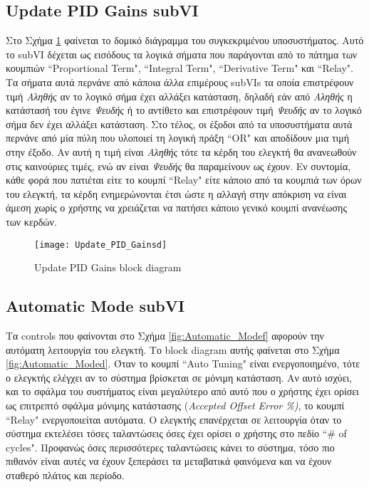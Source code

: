 \subsection{Update PID Gains subVI}

Στο Σχήμα \ref{fig:Update_PID_Gainsd} φαίνεται το δομικό διάγραμμα του συγκεκριμένου υποσυστήματος. Αυτό το subVI δέχεται ως εισόδους τα λογικά σήματα που παράγονται από το πάτημα των κουμπιών ``Proportional Term", ``Integral Term", ``Derivative Term" και ``Relay". Τα σήματα αυτά περνάνε από κάποια άλλα επιμέρους subVIs τα οποία επιστρέφουν τιμή \textit{Αληθής} αν το λογικό σήμα έχει αλλάξει κατάσταση, δηλαδή εάν από \textit{Αληθής} η κατάστασή του έγινε \textit{Ψευδής} ή το αντίθετο και επιστρέφουν τιμή \textit{Ψευδής} αν το λογικό σήμα δεν έχει αλλάξει κατάσταση. Στο τέλος, οι έξοδοι από τα υποσυστήματα αυτά περνάνε από μία πύλη που υλοποιεί τη λογική πράξη ``OR" και αποδίδουν μια τιμή στην έξοδο. Αν αυτή η τιμή είναι \emph{Αληθής} τότε τα κέρδη του ελεγκτή θα ανανεωθούν στις καινούριες τιμές, ενώ αν είναι \emph{Ψευδής} θα παραμείνουν ως έχουν. Εν συντομία, κάθε φορά που πατιέται είτε το κουμπί ``Relay" είτε κάποιο από τα κουμπιά των όρων του ελεγκτή, τα κέρδη ενημερώνονται έτσι ώστε η αλλαγή στην απόκριση να είναι άμεση χωρίς ο χρήστης να χρειάζεται να πατήσει κάποιο γενικό κουμπί ανανέωσης των κερδών.

\begin{figure}[h!]
  \centering
  \texttt{[image: Update\_PID\_Gainsd]}
  \caption{Update PID Gains block diagram}
  \label{fig:Update_PID_Gainsd}
\end{figure}

\subsection{Automatic Mode subVI}

Τα controls που φαίνονται στο Σχήμα \ref{fig:Automatic_Modef} αφορούν την αυτόματη λειτουργία του ελεγκτή. Το block diagram αυτής φαίνεται στο Σχήμα \ref{fig:Automatic_Moded}. Όταν το κουμπί ``Auto Tuning" είναι ενεργοποιημένο, τότε ο ελεγκτής ελέγχει αν το σύστημα βρίσκεται σε μόνιμη κατάσταση. Αν αυτό ισχύει, και το σφάλμα του συστήματος είναι μεγαλύτερο από αυτό που ο χρήστης έχει ορίσει ως επιτρεπτό σφάλμα μόνιμης κατάστασης (\emph{Accepted Offset Error \%)}, το κουμπί ``Relay" ενεργοποιείται αυτόματα. Ο ελεγκτής επανέρχεται σε λειτουργία όταν το σύστημα εκτελέσει τόσες ταλαντώσεις όσες έχει ορίσει ο χρήστης στο πεδίο ``\# of cycles". Προφανώς όσες περισσότερες ταλαντώσεις κάνει το σύστημα, τόσο πιο πιθανόν είναι αυτές να έχουν ξεπεράσει τα μεταβατικά φαινόμενα και να έχουν σταθερό πλάτος και περίοδο.

